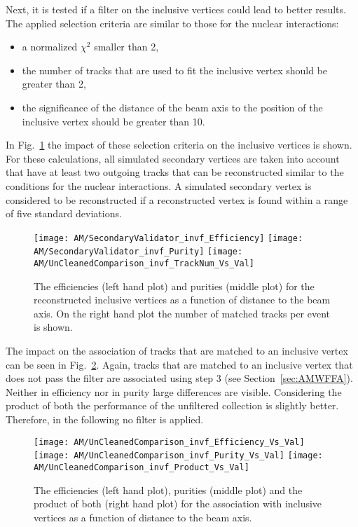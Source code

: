 Next, it is tested if a filter on the inclusive vertices could lead to better results. The applied selection criteria are similar to those for the nuclear interactions:
\begin{itemize}
    \item a normalized $\chi^{2}$ smaller than 2,
    \item the number of tracks that are used to fit the inclusive vertex should be greater than 2,
    \item the significance of the distance of the beam axis to the position of the inclusive vertex should be greater than 10.
\end{itemize}

In Fig.~\ref{plot:AMWFSVinvfEffAndPurDC} the impact of these selection criteria on the inclusive vertices is shown. For these calculations, all simulated secondary vertices are taken into account that have at least two outgoing tracks that can be reconstructed similar to the conditions for the nuclear interactions. A simulated secondary vertex is considered to be reconstructed if a reconstructed vertex is found within a range of five standard deviations.

\begin{figure}[!ht]
    \centering
    \texttt{[image: AM/SecondaryValidator\_invf\_Efficiency]}
    \texttt{[image: AM/SecondaryValidator\_invf\_Purity]}
    \texttt{[image: AM/UnCleanedComparison\_invf\_TrackNum\_Vs\_Val]}
    \caption[Purity and efficiency of the reconstructed inclusive vertices as a function of distance to the beam axis and number of matched tracks]{The efficiencies (left hand plot) and purities (middle plot) for the reconstructed inclusive vertices as a function of distance to the beam axis. On the right hand plot the number of matched tracks per event is shown. \label{plot:AMWFSVinvfEffAndPurDC}}
\end{figure}

The impact on the association of tracks that are matched to an inclusive vertex can be seen in Fig.~\ref{plot:AMWFSVinvfEffAndPurRT}.  Again, tracks that are matched to an inclusive vertex that does not pass the filter are associated using step 3 (see Section~\ref{sec:AMWFFA}). Neither in efficiency nor in purity large differences are visible. Considering the product of both the performance of the unfiltered collection is slightly better. Therefore, in the following no filter is applied.

\begin{figure}[!ht]
    \centering
    \texttt{[image: AM/UnCleanedComparison\_invf\_Efficiency\_Vs\_Val]}
    \texttt{[image: AM/UnCleanedComparison\_invf\_Purity\_Vs\_Val]}
    \texttt{[image: AM/UnCleanedComparison\_invf\_Product\_Vs\_Val]}
    \caption[Efficiencies, purities and their product for the association with inclusive vertices a function of distance to the beam axis]{The efficiencies (left hand plot), purities (middle plot) and the product of both (right hand plot) for the association with inclusive vertices as a function of distance to the beam axis. \label{plot:AMWFSVinvfEffAndPurRT}}
\end{figure}

